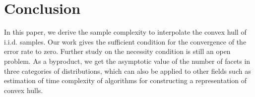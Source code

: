 \documentclass[conference,a4paper]{IEEEtran}
\begin{document}



\section{Conclusion}
\label{sec:conclusion}
In this paper, we derive the sample complexity to interpolate
the convex hull of i.i.d. samples. Our work gives the sufficient
condition for the convergence of the error rate to zero. Further
study on the necessity condition is still an open problem.
As a byproduct, we get the asymptotic value of the number of facets
in three categories of distributions, which can also be applied
to other fields such as estimation of time complexity of algorithms
for constructing a representation of convex hulls.
\end{document}
